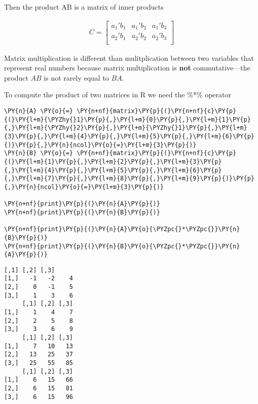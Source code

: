 Then the product AB is a matrix of inner products

\begin{align}
    C = \begin{bmatrix}
             a_{1}'b_{1} & a_{1}'b_{2} & a_{1}'b_{3} \\ 
             a_{2}'b_{1} & a_{2}'b_{2} & a_{2}'b_{3} \\ 
         \end{bmatrix}
\end{align}

Matrix multiplication is different than mulitplication between two
variables that represent real numbers because matrix multiplication is
\textbf{not} commutative---the product \(AB\) is not rarely equal to
\(BA\).

To compute the product of two matrices in R we need the \%*\% operator

    \begin{tcolorbox}[breakable, size=fbox, boxrule=1pt, pad at break*=1mm,colback=cellbackground, colframe=cellborder]
\begin{Verbatim}[commandchars=\\\{\}]
\PY{n}{A} \PY{o}{=} \PY{n+nf}{matrix}\PY{p}{(}\PY{n+nf}{c}\PY{p}{(}\PY{l+m}{\PYZhy{}1}\PY{p}{,}\PY{l+m}{0}\PY{p}{,}\PY{l+m}{1}\PY{p}{,}\PY{l+m}{\PYZhy{}2}\PY{p}{,}\PY{l+m}{\PYZhy{}1}\PY{p}{,}\PY{l+m}{3}\PY{p}{,}\PY{l+m}{4}\PY{p}{,}\PY{l+m}{5}\PY{p}{,}\PY{l+m}{6}\PY{p}{)}\PY{p}{,}\PY{n}{ncol}\PY{o}{=}\PY{l+m}{3}\PY{p}{)}
\PY{n}{B} \PY{o}{=} \PY{n+nf}{matrix}\PY{p}{(}\PY{n+nf}{c}\PY{p}{(}\PY{l+m}{1}\PY{p}{,}\PY{l+m}{2}\PY{p}{,}\PY{l+m}{3}\PY{p}{,}\PY{l+m}{4}\PY{p}{,}\PY{l+m}{5}\PY{p}{,}\PY{l+m}{6}\PY{p}{,}\PY{l+m}{7}\PY{p}{,}\PY{l+m}{8}\PY{p}{,}\PY{l+m}{9}\PY{p}{)}\PY{p}{,}\PY{n}{ncol}\PY{o}{=}\PY{l+m}{3}\PY{p}{)}

\PY{n+nf}{print}\PY{p}{(}\PY{n}{A}\PY{p}{)}
\PY{n+nf}{print}\PY{p}{(}\PY{n}{B}\PY{p}{)}

\PY{n+nf}{print}\PY{p}{(}\PY{n}{A}\PY{o}{\PYZpc{}*\PYZpc{}}\PY{n}{B}\PY{p}{)}
\PY{n+nf}{print}\PY{p}{(}\PY{n}{B}\PY{o}{\PYZpc{}*\PYZpc{}}\PY{n}{A}\PY{p}{)}
\end{Verbatim}
\end{tcolorbox}

    \begin{Verbatim}[commandchars=\\\{\}]
     [,1] [,2] [,3]
[1,]   -1   -2    4
[2,]    0   -1    5
[3,]    1    3    6
     [,1] [,2] [,3]
[1,]    1    4    7
[2,]    2    5    8
[3,]    3    6    9
     [,1] [,2] [,3]
[1,]    7   10   13
[2,]   13   25   37
[3,]   25   55   85
     [,1] [,2] [,3]
[1,]    6   15   66
[2,]    6   15   81
[3,]    6   15   96
    \end{Verbatim}

